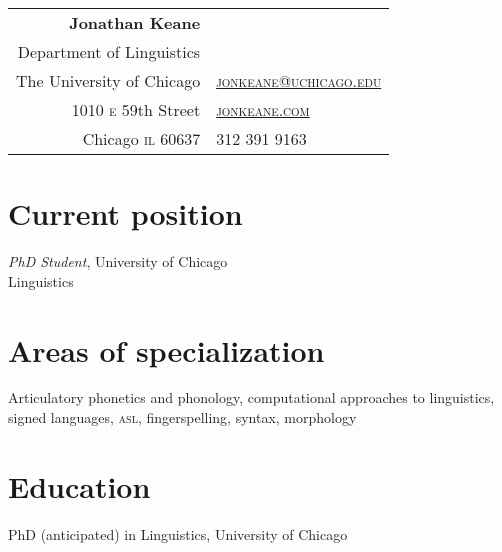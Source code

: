 \documentclass[10pt, letterpaper]{article}
\newcommand{\years}[1]{\marginpar{\scriptsize #1}}
\begin{document}
\thispagestyle{empty} %
\reversemarginpar
\raggedright

\begin{table}[!t]
  \begin{tabular*}{6.5in}{r|l}
    \hspace{3in}\textbf{\LARGE\sffamily Jonathan Keane}  &\\
Department of Linguistics & \\
  The University of Chicago & \href{mailto:jonkeane@uchicago.edu}{\textsc{jonkeane@uchicago.edu}}\\
1010 \textsc{e} 59th Street & \href{http://jonkeane.com}{\textsc{jonkeane.com}}\\
    Chicago \textsc{il} 60637 & 312 391 9163 \\
  \end{tabular*}
\end{table}
\setlength\parindent{0in}
\setlength\parskip{0ex}
\section*{Current position}
\emph{PhD Student}, University of Chicago\\
Linguistics\\

\section*{Areas of specialization}
Articulatory phonetics and phonology, computational approaches to linguistics, signed languages, \textsc{asl}, fingerspelling, syntax, morphology


\section*{Education}
\-\years{2013}PhD (anticipated) in Linguistics, University of Chicago

\end{document}
